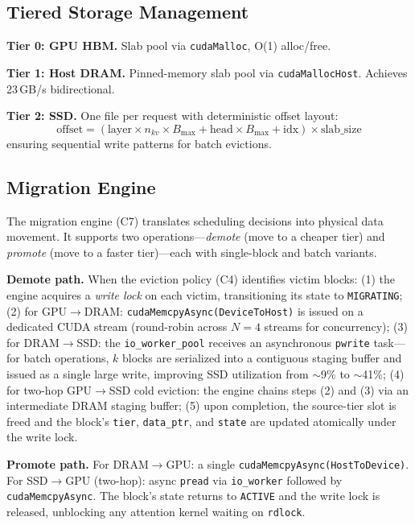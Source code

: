 \documentclass[conference]{IEEEtran}
\begin{document}
\subsection{Tiered Storage Management}
\label{sec:tiered-storage}

\textbf{Tier 0: GPU HBM.} Slab pool via \texttt{cudaMalloc}, O(1) alloc/free.

\textbf{Tier 1: Host DRAM.} Pinned-memory slab pool via \texttt{cudaMallocHost}. Achieves 23\,GB/s bidirectional.

\textbf{Tier 2: SSD.} One file per request with deterministic offset layout:
\begin{equation}
\text{offset} = (\text{layer} \times n_{kv} \times B_{\max} + \text{head} \times B_{\max} + \text{idx}) \times \text{slab\_size}
\end{equation}
ensuring sequential write patterns for batch evictions.

\subsection{Migration Engine}

The migration engine (C7) translates scheduling decisions into physical data movement. It supports two operations---\emph{demote} (move to a cheaper tier) and \emph{promote} (move to a faster tier)---each with single-block and batch variants.

\textbf{Demote path.} When the eviction policy (C4) identifies victim blocks: (1) the engine acquires a \emph{write lock} on each victim, transitioning its state to \texttt{MIGRATING}; (2) for GPU$\to$DRAM: \texttt{cudaMemcpyAsync(DeviceToHost)} is issued on a dedicated CUDA stream (round-robin across $N{=}4$ streams for concurrency); (3) for DRAM$\to$SSD: the \texttt{io\_worker\_pool} receives an asynchronous \texttt{pwrite} task---for batch operations, $k$ blocks are serialized into a contiguous staging buffer and issued as a single large write, improving SSD utilization from ${\sim}$9\% to ${\sim}$41\%; (4) for two-hop GPU$\to$SSD cold eviction: the engine chains steps (2) and (3) via an intermediate DRAM staging buffer; (5) upon completion, the source-tier slot is freed and the block's \texttt{tier}, \texttt{data\_ptr}, and \texttt{state} are updated atomically under the write lock.

\textbf{Promote path.} For DRAM$\to$GPU: a single \texttt{cudaMemcpyAsync(HostToDevice)}. For SSD$\to$GPU (two-hop): async \texttt{pread} via \texttt{io\_worker} followed by \texttt{cudaMemcpyAsync}. The block's state returns to \texttt{ACTIVE} and the write lock is released, unblocking any attention kernel waiting on \texttt{rdlock}.
\end{document}
